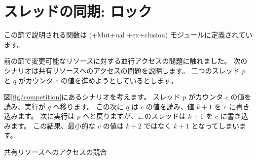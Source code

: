 \section{スレッドの同期: ロック}
この節で説明される関数は  (\ml+Mut+ual \ml+ex+clusion) モジュールに定義されています。

前の節で変更可能なリソースに対する並行アクセスの問題に触れました。
次のシナリオは共有リソースへのアクセスの問題を説明します。
二つのスレッド $p$ と $q$ がカウンタ $c$ の値を進めようとしているとします。

図\ref {fig/competition}にあるシナリオを考えます。
スレッド $p$ がカウンタ $c$ の値を読み、実行が $q$ へ移ります。
この次に $q$ は $c$ の値を読み、値 $k+1$ を $c$ に書き込みます。
次に実行は $p$ へと戻りますが、このスレッドは $k+1$ を $c$ に書き込みます。
この結果、最小的な $c$ の値は $k+2$ ではなく $k+1$ となってしまいます。
\begin{myfigure}
\begin{myimage}[width="100\%"]
\end{myimage}
\caption {共有リソースへのアクセスの競合}
\label{fig/competition}
\end{myfigure}

